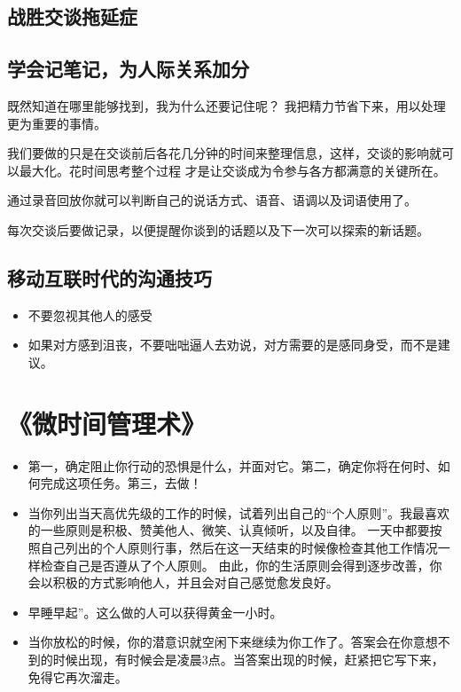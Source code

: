 \documentclass[UTF8,a4paper,8pt]{ctexbook}
\begin{document}
		\subsection{战胜交谈拖延症}
		
		\subsection{学会记笔记，为人际关系加分}
			既然知道在哪里能够找到，我为什么还要记住呢？ 我把精力节省下来，用以处理更为重要的事情。
		
			我们要做的只是在交谈前后各花几分钟的时间来整理信息，这样，交谈的影响就可以最大化。花时间思考整个过程 才是让交谈成为令参与各方都满意的关键所在。
			
			通过录音回放你就可以判断自己的说话方式、语音、语调以及词语使用了。
			
			每次交谈后要做记录，以便提醒你谈到的话题以及下一次可以探索的新话题。
		\subsection{移动互联时代的沟通技巧}
		
			\begin{itemize}
				\item 不要忽视其他人的感受
				\item 如果对方感到沮丧，不要咄咄逼人去劝说，对方需要的是感同身受，而不是建议。
			\end{itemize}
		
	
	\newpage
	\section{《微时间管理术》 }
		\begin{itemize}
			\item 
			第一，确定阻止你行动的恐惧是什么，并面对它。第二，确定你将在何时、如何完成这项任务。第三，去做！
			\item 当你列出当天高优先级的工作的时候，试着列出自己的“个人原则”。我最喜欢的一些原则是积极、赞美他人、微笑、认真倾听，以及自律。 一天中都要按照自己列出的个人原则行事，然后在这一天结束的时候像检查其他工作情况一样检查自己是否遵从了个人原则。 由此，你的生活原则会得到逐步改善，你会以积极的方式影响他人，并且会对自己感觉愈发良好。
			\item 早睡早起”。这么做的人可以获得黄金一小时。
			\item 当你放松的时候，你的潜意识就空闲下来继续为你工作了。答案会在你意想不到的时候出现，有时候会是凌晨3点。当答案出现的时候，赶紧把它写下来，免得它再次溜走。	
		\end{itemize}
	
\end{document}
